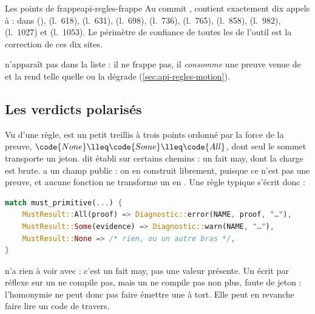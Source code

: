 \begin{invariant}{Les points de frappe}{api-regles-frappe}
Au commit \snapshotCommit,  contient exactement dix appels à  : dans  (),  (l.~618),  (l.~631),  (l.~698),  (l.~736),  (l.~765),  (l.~858),  (l.~982),  (l.~1027) et  (l.~1053). Le périmètre de confiance de toutes les \Error{} de l'outil est la correction de ces dix sites.
\end{invariant}

 n'apparaît pas dans la liste : il ne frappe pas, il \emph{consomme} une preuve venue de  et la rend telle quelle ou la dégrade (\cref{sec:api-regles-motion}).

\subsection{Les verdicts polarisés}


Vu d'une règle,  est un petit treillis à trois points ordonné par la force de la preuve, $\code{None} \lleq \code{Some} \lleq \code{All}$, dont seul le sommet transporte un jeton.  dit \og établi sur certains chemins\fg{} : un fait may, dont la charge est brute.  a un champ public : on en construit librement, puisque ce n'est pas une preuve, et aucune fonction ne transforme un  en . Une règle typique s'écrit donc :

\begin{lstlisting}[language=Rust,caption={Forme usuelle de consommation d'un \code{MustResult} (pseudo-code)}]
match must_primitive(...) {
    MustResult::All(proof) => Diagnostic::error(NAME, proof, "…"),
    MustResult::Some(evidence) => Diagnostic::warn(NAME, "…"),
    MustResult::None => /* rien, ou un autre bras */,
}
\end{lstlisting}

\begin{piege}
 n'a rien à voir avec  : c'est un fait may, pas \og une valeur présente\fg. Un  écrit par réflexe sur un  ne compile pas, mais un  ne compile pas non plus, faute de jeton : l'homonymie ne peut donc pas faire émettre une \Error{} à tort. Elle peut en revanche faire lire un code de travers.
\end{piege}

